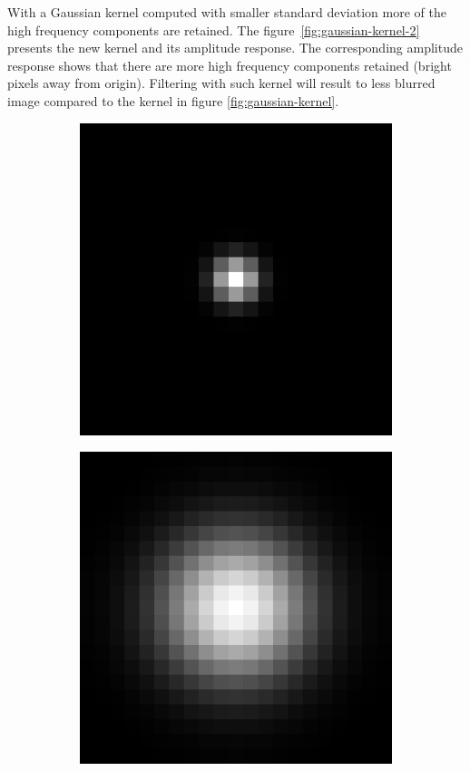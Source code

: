 \documentclass[]{article}
\begin{document}
With a Gaussian kernel computed with smaller standard deviation more of the high
frequency components are retained. The figure~\ref{fig:gaussian-kernel-2}
presents the new kernel and its amplitude response. The corresponding amplitude
response shows that there are more high frequency components retained (bright
pixels away from origin). Filtering with such kernel will result to less blurred
image compared to the kernel in figure \ref{fig:gaussian-kernel}.
\begin{figure}
  \centering
    \begin{subfigure}[t]{0.49\textwidth}
      \centering
      \includegraphics[width=0.99\linewidth]{kernel2.png}
    \end{subfigure}
    \begin{subfigure}[t]{0.49\textwidth}
      \centering
      \includegraphics[width=0.99\linewidth]{freq2.png}

\end{subfigure}
\end{figure}
\end{document}
